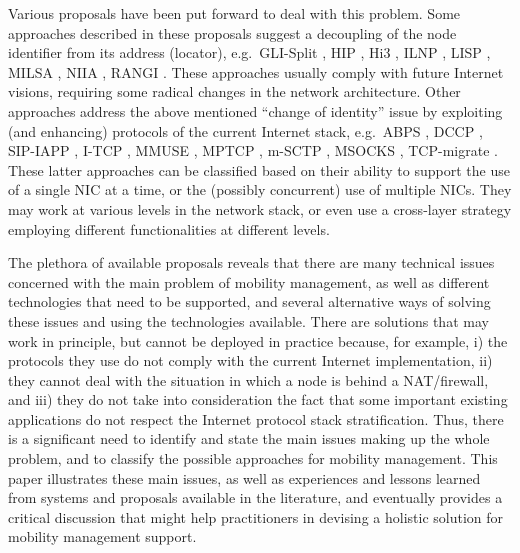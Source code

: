 \documentclass[preprint,12pt]{elsarticle}
\begin{document}
Various proposals have been put forward to deal with 
this problem. Some approaches described in these proposals suggest a decoupling of the 
node identifier from its address (locator), e.g.~GLI-Split \cite{gli-split}, 
HIP \cite{BokorZNJ09,rfc4423}, Hi3 \cite{GurtovKLN08}, ILNP 
\cite{rfc6740}, LISP \cite{lisp}, MILSA \cite{Pan:2010}, NIIA 
\cite{niia,Schutz:2010}, RANGI \cite{rangi}. These approaches usually comply 
with future Internet visions, requiring some radical changes in the network 
architecture.
Other approaches address the above mentioned ``change of identity'' issue by exploiting (and enhancing) protocols of the 
current Internet stack, e.g.~ABPS \cite{GhiniJSS}, DCCP \cite{rfc4340}, 
SIP-IAPP \cite{802f02,WuYH07},
I-TCP \cite{itcp},
MMUSE \cite{SalsanoPMNV08},
MPTCP \cite{mptcp,Paasch:2012}, 
m-SCTP \cite{Budzisz:2012}, 
MSOCKS \cite{msocks}, 
TCP-migrate \cite{snoeren2001reconsidering}.
These latter approaches can be classified based on their ability to support the use of a single \ac{NIC} at a time, or the 
(possibly concurrent) use of multiple \acp{NIC}.  
They may work at various levels in the network 
stack, or even use a cross-layer strategy employing different functionalities at 
different levels. 

The plethora of available proposals reveals that there are many technical issues concerned with the main problem of mobility management, as well as different technologies that need to be supported, and several alternative ways of solving these issues and using the technologies available. 
There are solutions that may work in principle, but cannot be deployed in practice because, for example, 
i) the protocols they use do not comply with the current Internet implementation, 
ii) they cannot deal with the situation in which a node is behind a \ac{NAT}/firewall, and
iii) they do not take into consideration the fact that some important 
existing applications do not respect the Internet protocol stack stratification.
Thus, there is a significant need to identify and state the main issues making up the whole problem, and to classify the possible approaches for mobility management.
This paper illustrates these main issues, as well as experiences and 
lessons learned from systems and proposals available in the literature, and eventually
provides a critical discussion that might help practitioners in devising a 
holistic solution for mobility management support.
\end{document}
